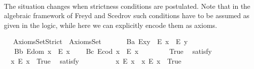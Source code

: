 \begin{isabellebody}
{\isafoldproof}%
%
\isadelimproof
%
\endisadelimproof
\ \isanewline
\ \ \isamarkupfalse%
%
\isamarkuptrue%
%
\begin{isamarkuptext}%
The situation changes when strictness conditions are postulated. Note that in the algebraic 
      framework of Freyd and Scedrov such conditions have to be assumed as given in the 
      logic, while here we can explicitly encode them as axioms.%
\end{isamarkuptext}\isamarkuptrue%
\ \isamarkupfalse%
\ AxiomsSet{}Strict\ {\isacharequal}\ AxiomsSet{}\ {\isacharplus}\isanewline
\ \ \isanewline
\ \ \ B{}a{\isacharcolon}\ {\isachardoublequoteopen}E{\isacharparenleft}x{\isasymcdot}y{\isacharparenright}\ \isactrlbold {\isasymrightarrow}\ {\isacharparenleft}E\ x\ \isactrlbold {\isasymand}\ E\ y{\isacharparenright}{\isachardoublequoteclose}\ \isanewline
\ \ \ B{}b{\isacharcolon}\ {\isachardoublequoteopen}E{\isacharparenleft}dom\ x{\isacharparenright}\ \isactrlbold {\isasymrightarrow}\ E\ x{\isachardoublequoteclose}\ \isanewline
\ \ \ B{}c{\isacharcolon}\ {\isachardoublequoteopen}E{\isacharparenleft}cod\ x{\isacharparenright}\ \isactrlbold {\isasymrightarrow}\ E\ x{\isachardoublequoteclose}\ \isanewline
\ \ \isanewline
\ \ \ \isamarkupfalse%
\ True\ \isamarkupfalse%
\ {\isacharbrackleft}satisfy{\isacharbrackright}%
\isadelimproof
\ %
\endisadelimproof
%
\isatagproof
{}\isamarkupfalse%
\ \ %
%
\endisatagproof
{\isafoldproof}%
%
\isadelimproof
%
\endisadelimproof
\isanewline
\ \ \ \isamarkupfalse%
\ \ {\isachardoublequoteopen}{\isasymexists}x{\isachardot}\ \isactrlbold {\isasymnot}{\isacharparenleft}E\ x{\isacharparenright}{\isachardoublequoteclose}\ \ True\ \isamarkupfalse%
\ {\isacharbrackleft}satisfy{\isacharbrackright}%
\isadelimproof
\ %
\endisadelimproof
%
\isatagproof
{}\isamarkupfalse%
\ \ %
%
\endisatagproof
{\isafoldproof}%
%
\isadelimproof
%
\endisadelimproof
\isanewline
\ \ \ \isamarkupfalse%
\ \ {\isachardoublequoteopen}{\isacharparenleft}{\isasymexists}x{\isachardot}\ \isactrlbold {\isasymnot}{\isacharparenleft}E\ x{\isacharparenright}{\isacharparenright}\ {\isasymand}\ {\isacharparenleft}{\isasymexists}x{\isachardot}\ {\isacharparenleft}E\ x{\isacharparenright}{\isacharparenright}{\isachardoublequoteclose}\ \ True\ \isamarkupfalse%

\end{isabellebody}
